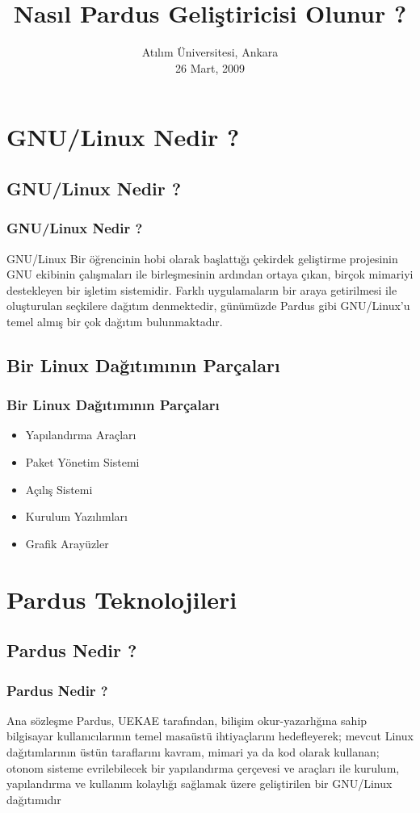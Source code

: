 \documentclass{beamer}
\title{Nasıl Pardus Geliştiricisi Olunur ?}
\author[Gökmen Göksel \& Gökçen Eraslan]{}
\date{Atılım Üniversitesi, Ankara\\ 26 Mart, 2009}
\institute{
  Ulusal Elektronik ve Kriptoloji Araştırma Enstitüsü\\
  TÜBİTAK}
\begin{document}
\frame{\titlepage}

\section{GNU/Linux Nedir ?}

\subsection{GNU/Linux Nedir ?}
\frame
{
    \frametitle{GNU/Linux Nedir ?}
    \begin{block}{GNU/Linux}
        Bir öğrencinin hobi olarak başlattığı çekirdek geliştirme projesinin GNU ekibinin çalışmaları ile birleşmesinin ardından ortaya çıkan, birçok mimariyi destekleyen bir işletim sistemidir. Farklı uygulamaların bir araya getirilmesi ile oluşturulan seçkilere dağıtım denmektedir, günümüzde Pardus gibi GNU/Linux'u temel almış bir çok dağıtım bulunmaktadır.
    \end{block}
}

\subsection{Bir Linux Dağıtımının Parçaları}
\frame
{
    \frametitle{Bir Linux Dağıtımının Parçaları}
    \begin{itemize}
       \item Yapılandırma Araçları
       \item Paket Yönetim Sistemi
       \item Açılış Sistemi
       \item Kurulum Yazılımları
       \item Grafik Arayüzler
    \end{itemize}
}

\section{Pardus Teknolojileri}

\subsection{Pardus Nedir ?}
\frame
{
    \frametitle{Pardus Nedir ?}
    \begin{block}{Ana sözleşme}
        Pardus, UEKAE tarafından, bilişim okur-yazarlığına sahip bilgisayar kullanıcılarının temel masaüstü ihtiyaçlarını hedefleyerek; mevcut Linux dağıtımlarının üstün taraflarını kavram, mimari ya da kod olarak kullanan; otonom sisteme evrilebilecek bir yapılandırma çerçevesi ve araçları ile kurulum, yapılandırma ve kullanım kolaylığı sağlamak üzere geliştirilen bir GNU/Linux dağıtımıdır
    \end{block}
}
\end{document}
